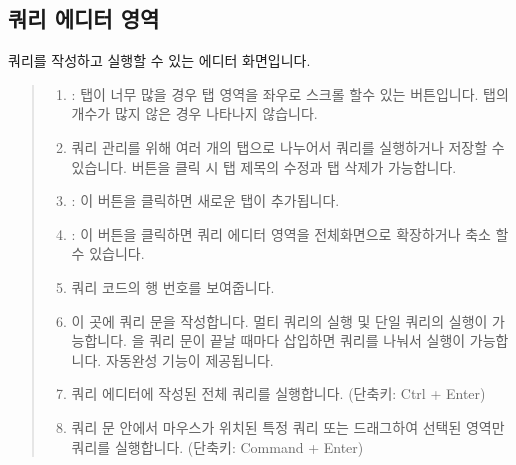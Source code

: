 \documentclass[letterpaper,10pt,english]{sphinxmanual}
\begin{document}
\subsection{쿼리 에디터 영역}
\label{\detokenize{discovery/part06/06_03-use_a_workbench:workbench-use-3}}\label{\detokenize{discovery/part06/06_03-use_a_workbench:id4}}
쿼리를 작성하고 실행할 수 있는 에디터 화면입니다.
\begin{quote}

\begin{figure}[H]
\centering

\noindent{}
\end{figure}
\begin{enumerate}
\def\theenumi{\arabic{enumi}}
\def\labelenumi{\theenumi .}
\makeatletter\def\p@enumii{\p@enumi \theenumi .}\makeatother
\item {} 
 : 탭이 너무 많을 경우 탭 영역을 좌우로 스크롤 할수 있는 버튼입니다. 탭의 개수가 많지 않은 경우 나타나지 않습니다.

\item {} 
 쿼리 관리를 위해 여러 개의 탭으로 나누어서 쿼리를 실행하거나 저장할 수 있습니다.  버튼을 클릭 시 탭 제목의 수정과 탭 삭제가 가능합니다.

\item {} 
 : 이 버튼을 클릭하면 새로운 탭이 추가됩니다.

\item {} 
 : 이 버튼을 클릭하면 쿼리 에디터 영역을 전체화면으로 확장하거나 축소 할 수 있습니다.

\item {} 
 쿼리 코드의 행 번호를 보여줍니다.

\item {} 
 이 곳에 쿼리 문을 작성합니다. 멀티 쿼리의 실행 및 단일 쿼리의 실행이 가능합니다. \sphinxcode{\sphinxupquote{;}}을 쿼리 문이 끝날 때마다 삽입하면 쿼리를 나눠서 실행이 가능합니다. 자동완성 기능이 제공됩니다.

\item {} 
 쿼리 에디터에 작성된 전체 쿼리를 실행합니다. (단축키: Ctrl + Enter)

\item {} 
 쿼리 문 안에서 마우스가 위치된 특정 쿼리 또는 드래그하여 선택된 영역만 쿼리를 실행합니다. (단축키: Command + Enter)


\end{enumerate}
\end{quote}
\end{document}
